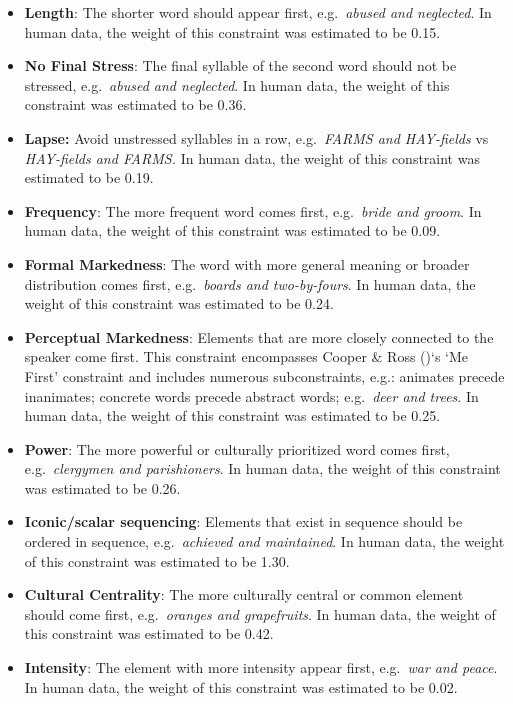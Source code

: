 \documentclass[
  12pt,
  letterpaper,
]{scrreport}
\begin{document}
\begin{itemize}
\item
  \textbf{Length}: The shorter word should appear first,
  e.g.~\emph{abused and neglected}. In human data, the weight of this
  constraint was estimated to be 0.15.
\item
  \textbf{No Final Stress}: The final syllable of the second word should
  not be stressed, e.g.~\emph{abused and neglected}. In human data, the
  weight of this constraint was estimated to be 0.36.
\item
  \textbf{Lapse:} Avoid unstressed syllables in a row, e.g.~\emph{FARMS
  and HAY-fields} vs \emph{HAY-fields and FARMS.} In human data, the
  weight of this constraint was estimated to be 0.19.
\item
  \textbf{Frequency}: The more frequent word comes first,
  e.g.~\emph{bride and groom}. In human data, the weight of this
  constraint was estimated to be 0.09.
\item
  \textbf{Formal Markedness}: The word with more general meaning or
  broader distribution comes first, e.g.~\emph{boards and two-by-fours}.
  In human data, the weight of this constraint was estimated to be 0.24.
\item
  \textbf{Perceptual Markedness}: Elements that are more closely
  connected to the speaker come first. This constraint encompasses
  Cooper \& Ross ()`s `Me
  First' constraint and includes numerous subconstraints, e.g.: animates
  precede inanimates; concrete words precede abstract words;
  e.g.~\emph{deer and trees}. In human data, the weight of this
  constraint was estimated to be 0.25.
\item
  \textbf{Power}: The more powerful or culturally prioritized word comes
  first, e.g.~\emph{clergymen and parishioners}. In human data, the
  weight of this constraint was estimated to be 0.26.
\item
  \textbf{Iconic/scalar sequencing}: Elements that exist in sequence
  should be ordered in sequence, e.g.~\emph{achieved and maintained}. In
  human data, the weight of this constraint was estimated to be 1.30.
\item
  \textbf{Cultural Centrality}: The more culturally central or common
  element should come first, e.g.~\emph{oranges and grapefruits}. In
  human data, the weight of this constraint was estimated to be 0.42.
\item
  \textbf{Intensity}: The element with more intensity appear first,
  e.g.~\emph{war and peace}. In human data, the weight of this
  constraint was estimated to be 0.02.
\end{itemize}
\end{document}
